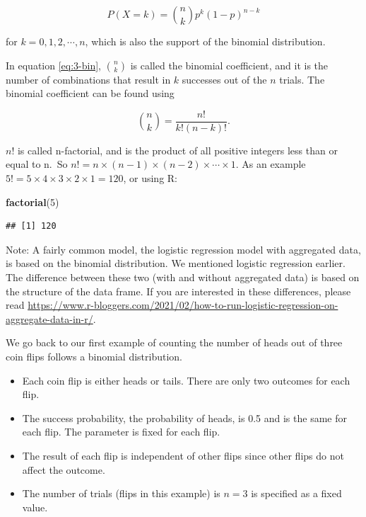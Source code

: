\documentclass[
]{book}
\newenvironment{Shaded}{\begin{snugshade}}{\end{snugshade}}
\newcommand{\DecValTok}[1]{\textcolor[rgb]{0.00,0.00,0.81}{#1}}
\newcommand{\FunctionTok}[1]{\textcolor[rgb]{0.13,0.29,0.53}{\textbf{#1}}}
\newcommand{\NormalTok}[1]{#1}
\providecommand{\tightlist}{%
  \setlength{\itemsep}{0pt}\setlength{\parskip}{0pt}}
\begin{document}
\begin{equation} 
P(X=k) = \binom{n}{k} p^k (1-p)^{n-k}
\label{eq:3-bin}
\end{equation}

for \(k=0,1,2, \cdots, n\), which is also the support of the binomial distribution.

In equation \eqref{eq:3-bin}, \(\binom{n}{k}\) is called the binomial coefficient, and it is the number of combinations that result in \(k\) successes out of the \(n\) trials. The binomial coefficient can be found using

\begin{equation} 
\binom{n}{k} =  \frac{n!}{k! (n-k)!}.
\label{eq:3-bincoeff}
\end{equation}

\(n!\) is called n-factorial, and is the product of all positive integers less than or equal to n.~So \(n! = n \times (n-1) \times (n-2) \times \cdots \times 1.\) As an example \(5! = 5 \times 4 \times 3 \times 2 \times 1 = 120\), or using R:

\begin{Shaded}
\begin{Highlighting}[]
\FunctionTok{factorial}\NormalTok{(}\DecValTok{5}\NormalTok{)}
\end{Highlighting}
\end{Shaded}

\begin{verbatim}
## [1] 120
\end{verbatim}

Note: A fairly common model, the logistic regression model with aggregated data, is based on the binomial distribution. We mentioned logistic regression earlier. The difference between these two (with and without aggregated data) is based on the structure of the data frame. If you are interested in these differences, please read \url{https://www.r-bloggers.com/2021/02/how-to-run-logistic-regression-on-aggregate-data-in-r/}.

We go back to our first example of counting the number of heads out of three coin flips follows a binomial distribution.

\begin{itemize}
\tightlist
\item
  Each coin flip is either heads or tails. There are only two outcomes for each flip.
\item
  The success probability, the probability of heads, is 0.5 and is the same for each flip. The parameter is fixed for each flip.
\item
  The result of each flip is independent of other flips since other flips do not affect the outcome.
\item
  The number of trials (flips in this example) is \(n=3\) is specified as a fixed value.
\end{itemize}
\end{document}
